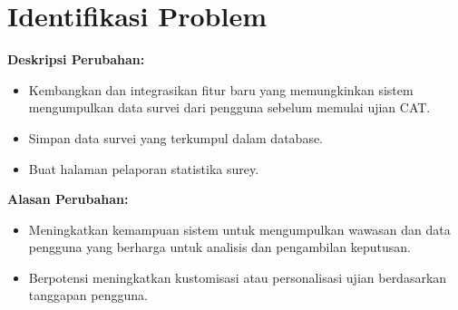 \documentclass[12pt]{article}
\begin{document}
\section*{Identifikasi Problem}
\textbf{Deskripsi Perubahan:}
\begin{itemize}
    \item Kembangkan dan integrasikan fitur baru yang memungkinkan sistem mengumpulkan data survei dari pengguna sebelum memulai ujian CAT.
    \item Simpan data survei yang terkumpul dalam database.
    \item Buat halaman pelaporan statistika surey.
\end{itemize}

\textbf{Alasan Perubahan:}
\begin{itemize}
    \item Meningkatkan kemampuan sistem untuk mengumpulkan wawasan dan data pengguna yang berharga untuk analisis dan pengambilan keputusan.
    \item Berpotensi meningkatkan kustomisasi atau personalisasi ujian berdasarkan tanggapan pengguna.
\end{itemize}


\end{document}
